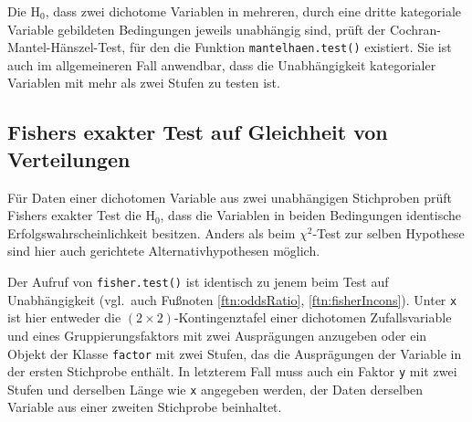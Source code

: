 Die $\text{H}_{0}$, dass zwei dichotome Variablen in mehreren, durch eine dritte kategoriale Variable gebildeten Bedingungen jeweils unabhängig sind, prüft der Cochran-Mantel-Hänszel-Test, für den die Funktion \lstinline!mantelhaen.test()! existiert. Sie ist auch im allgemeineren Fall anwendbar, dass die Unabhängigkeit kategorialer Variablen mit mehr als zwei Stufen zu testen ist.

\subsection{Fishers exakter Test auf Gleichheit von Verteilungen}
\label{sec:fisherEq}

Für Daten einer dichotomen Variable aus zwei unabhängigen Stichproben prüft Fishers exakter Test die $\text{H}_{0}$, dass die Variablen in beiden Bedingungen identische Erfolgswahrscheinlichkeit besitzen. Anders als beim $\chi^{2}$-Test zur selben Hypothese sind hier auch gerichtete Alternativhypothesen möglich.

Der Aufruf von \lstinline!fisher.test()! ist identisch zu jenem beim Test auf Unabhängigkeit (vgl.\ auch Fußnoten \ref{ftn:oddsRatio}, \ref{ftn:fisherIncons}). Unter \lstinline!x! ist hier entweder die $(2 \times 2)$-Kontingenztafel einer dichotomen Zufallsvariable und eines Gruppierungsfaktors mit zwei Ausprägungen anzugeben oder ein Objekt der Klasse \lstinline!factor! mit zwei Stufen, das die Ausprägungen der Variable in der ersten Stichprobe enthält. In letzterem Fall muss auch ein Faktor \lstinline!y! mit zwei Stufen und derselben Länge wie \lstinline!x! angegeben werden, der Daten derselben Variable aus einer zweiten Stichprobe beinhaltet.

